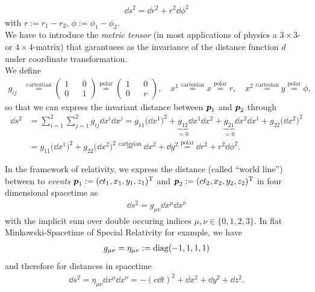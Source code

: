 \begin{align}
    \dd{s}^2 = \dd{r}^2 + r^2 \dd{\phi}^2 
\end{align}
with $r:= r_{1} - r_{2}$, $\phi := \phi_{1} - \phi_{2}$. \\
\noindent We have to introduce the \textit{metric tensor} (in most applications of physics a $3 \times 3$- or $4 \times 4$-matrix) that garantuees as the invariance of the distance function $d$ under coordinate transformation. \\
We define 
\begin{align}
    g_{ij} &\overset{\text{cartestian}}{=} \begin{pmatrix} 1 && 0 \\ 0 && 1 \end{pmatrix} \overset{\text{polar}}{=} \begin{pmatrix} 1 && 0 \\ 0 && r \end{pmatrix}, \quad x^{1} \overset{\text{cartesian}}{=} x \overset{\text{polar}}{=} r, \quad x^{2} \overset{\text{cartesian}}{=} y \overset{\text{polar}}{=} \phi,
\end{align}
so that we can express the invariant distance between $\vb*{p}_{1}$ and $\vb*{p}_{2}$ through
\begin{align}
    \dd{s}^2 &= \sum_{i = 1}^{2} \sum_{j = 1}^{2} g_{ij}\dd{x}^{i}\dd{x}^{j} = g_{11} \bigl(\dd{x}^{1}\bigr)^2 + \underbrace{g_{12}}_{= 0} \dd{x}^{1}\dd{x}^{2} + \underbrace{g_{21}}_{= 0} \dd{x}^{2} \dd{x}^{1} + g_{22} \bigl(\dd{x}^{2} \bigr)^2 \\
             &= g_{11} \bigl(\dd{x}^{1}\bigr)^2 + g_{22} \bigl(\dd{x}^{2}\bigr)^2 \overset{\text{cartesian}}{=} \dd{x}^{2} + \dd{y}^{2} \overset{\text{polar}}{=} \dd{r}^{2} + r^2 \dd{\phi}^{2}.  
\end{align}

\noindent In the framework of relativity, we express the distance (called ``world line'') between to \textit{events} $\vb*{p}_{1} := (c t_{1}, x_{1}, y_{1}, z_{1})^{\text{T}}$ and $\vb*{p}_{2} := (c t_{2}, x_{2}, y_{2}, z_{2})^{\text{T}}$ in four dimensional spacetime as
\begin{align}
    \dd{s}^2 = g_{\mu\nu} \dd{x}^{\mu} \dd{x}^{\nu}
\end{align}
with the implicit sum over double occuring indices $\mu, \nu \in \{0,1,2,3\}$. In flat Minkowski-Spacetime of Special Relativity for example, we have 
\begin{align}
    g_{\mu\nu} = \eta_{\mu\nu} := \operatorname{diag}(-1, 1, 1, 1) 
\end{align} 
and therefore for distances in spacetime
\begin{align}
    \dd{s}^2 = \eta_{\mu\nu} \dd{x}^{\mu} \dd{x}^{\nu} = - (c \dd{t})^{2} + \dd{x}^{2} + \dd{y}^{2} + \dd{z}^{2}.    
\end{align}






